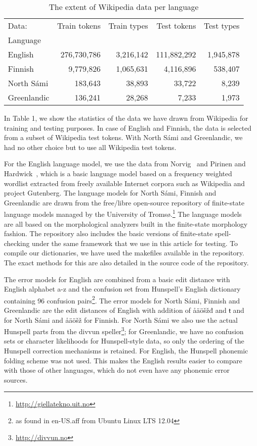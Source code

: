\documentclass[postprint]{flammie}
\begin{document}
\begin{table}
    \caption{The extent of Wikipedia data per language}
    \begin{tabular}{lrrrr}
Data: & Train tokens & Train types & Test tokens & Test types \\
            Language & & & & \\
English & 276,730,786 & 3,216,142 & 111,882,292 & 1,945,878 \\
            Finnish & 9,779,826 & 1,065,631 & 4,116,896 & 538,407 \\
            North Sámi & 183,643 & 38,893 & 33,722 & 8,239 \\
            Greenlandic & 136,241 & 28,268 & 7,233 & 1,973 \\
    \end{tabular}
\end{table}

In Table 1, we show the statistics of the data we have drawn from Wikipedia for
training and testing purposes. In case of English and Finnish, the data is
selected from a subset of Wikipedia test tokens. With North Sámi and
Greenlandic, we had no other choice but to use all Wikipedia test tokens.

For the English language model, we use the data from Norvig~\cite{norvig} and
Pirinen and Hardwick~\cite{pirinen2012effects}, which is a basic language model
based on a frequency weighted wordlist extracted from freely available Internet
corpora such as Wikipedia and project Gutenberg. The language models for North
Sámi, Finnish and Greenlandic are drawn from the free/libre open-source
repository of finite-state language models managed by the University of
Tromsø.\footnote{\url{http://giellatekno.uit.no}} The language models are all
based on the morphological analyzers built in the finite-state
morphology~\cite{beesley2003finite} fashion. The repository also includes the
basic versions of finite-state spell-checking under the same framework that we
use in this article for testing. To compile our dictionaries, we have used the
makefiles available in the repository. The exact methods for this are also
detailed in the source code of the repository.

The error models for English are combined from a basic edit distance with
English alphabet a-z and the confusion set from Hunspell’s English dictionary
containing 96 confusion pairs\footnote{as found in en-US.aff from Ubuntu Linux
LTS 12.04}. The error models for North Sámi, Finnish and Greenlandic are the
edit distances of English with addition of åäöšžđ and { ŧ}
and for North Sámi and åäöšž for Finnish. For North Sámi we also use the actual
Hunspell parts from the divvun speller\footnote{\url{http://divvun.no}}; for
Greenlandic, we have no confusion sets or character likelihoods for
Hunspell-style data, so only the ordering of the Hunspell correction mechanisms
is retained. For English, the Hunspell phonemic folding scheme was not used.
This makes the English results easier to compare with those of other languages,
which do not even have any phonemic error sources.
\end{document}
